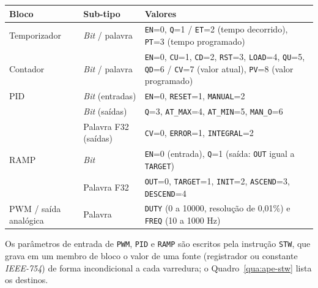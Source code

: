 \begin{quadrofixo}
    \centering
    \begin{tabular}{|l|p{3.1cm}|p{7.3cm}|}
        \hline
        Bloco & Sub-tipo & Valores \\
        \hline
        Temporizador & \textit{Bit} / palavra & \texttt{EN}=0, \texttt{Q}=1 / \texttt{ET}=2 (tempo decorrido), \texttt{PT}=3 (tempo programado) \\
        \hline
        Contador & \textit{Bit} / palavra & \texttt{EN}=0, \texttt{CU}=1, \texttt{CD}=2, \texttt{RST}=3, \texttt{LOAD}=4, \texttt{QU}=5, \texttt{QD}=6 / \texttt{CV}=7 (valor atual), \texttt{PV}=8 (valor programado) \\
        \hline
        PID & \textit{Bit} (entradas) & \texttt{EN}=0, \texttt{RESET}=1, \texttt{MANUAL}=2 \\
        \hline
        & \textit{Bit} (saídas) & \texttt{Q}=3, \texttt{AT\_MAX}=4, \texttt{AT\_MIN}=5, \texttt{MAN\_O}=6 \\
        \hline
        & Palavra F32 (saídas) & \texttt{CV}=0, \texttt{ERROR}=1, \texttt{INTEGRAL}=2 \\
        \hline
        RAMP & \textit{Bit} & \texttt{EN}=0 (entrada), \texttt{Q}=1 (saída: \texttt{OUT} igual a \texttt{TARGET}) \\
        \hline
        & Palavra F32 & \texttt{OUT}=0, \texttt{TARGET}=1, \texttt{INIT}=2, \texttt{ASCEND}=3, \texttt{DESCEND}=4 \\
        \hline
        PWM / saída analógica & Palavra & \texttt{DUTY} (0 a 10000, resolução de 0,01\%) e \texttt{FREQ} (10 a 1000 Hz) \\
        \hline
    \end{tabular}

    \label{qua:ape-subtipos}
\end{quadrofixo}

Os parâmetros de entrada de \texttt{PWM}, \texttt{PID} e \texttt{RAMP} são escritos pela instrução \texttt{STW}, que grava em um membro de bloco o valor de uma fonte (registrador ou constante \textit{IEEE-754}) de forma incondicional a cada varredura; o Quadro~\ref{qua:ape-stw} lista os destinos.

